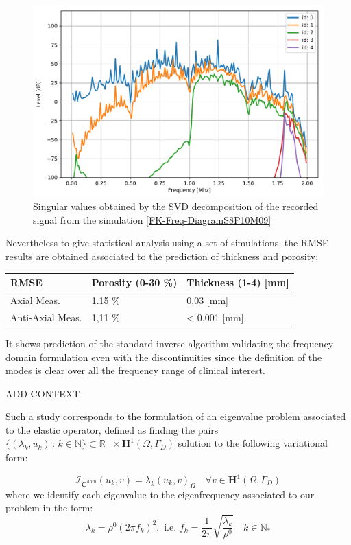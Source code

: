 \begin{figure}[!h]
	\centering
	\includegraphics[scale=.5]{images/FreqRes/2DFreqS810Elastic09_SV.pdf}
	\caption{Singular values obtained by the SVD decomposition of the recorded signal from the simulation \ref{FK-Freq-DiagramS8P10M09}}
	\label{SVD-Freq-S8P10M09}
\end{figure} 
Nevertheless to give statistical analysis using a set of simulations, the RMSE results are obtained associated to the prediction of thickness and porosity:
\begin{table}
\vspace{2ex}
\begin{tabular}{l l l}
\toprule
\textbf{RMSE} & \textbf{Porosity} (0-30 \%) & \textbf{Thickness} (1-4) [mm]\\
\midrule
Axial Meas. & 1.15 \% & 0,03  [mm]\\
Anti-Axial Meas. & 1,11 \%  & < 0,001 [mm]\\
\bottomrule
\end{tabular}
\end{table}
It shows prediction of the standard inverse algorithm validating the frequency domain formulation even with the discontinuities since the definition of the modes is clear over all the frequency range of clinical interest.

ADD CONTEXT 

Such a study corresponds to the formulation of an eigenvalue problem associated to the elastic operator, defined as finding the pairs $\{(\lambda_k, u_k) \, : \, k \in \mathbb{N} \} \subset \mathbb{R}_+ \times \mathbf{H}^1(\Omega, \Gamma_D)$ solution to the following variational form:

\begin{equation*}
    \label{VariationalEigenProb}
    \mathcal{I}_{\mathbf{C}^{hom}} (u_k, v) = \lambda_k (u_k, v)_{\Omega} \quad \forall v \in \mathbf{H}^1(\Omega, \Gamma_D)
\end{equation*}
where we identify each eigenvalue to the eigenfrequency associated to our problem in the form:
\begin{equation*}
    \lambda_k = \rho^0 (2\pi f_k)^2, \text{ i.e. } f_k = \frac{1}{2\pi} \sqrt{\frac{\lambda_k}{\rho^0}} \quad k \in \mathbb{N}_{*}
\end{equation*}

